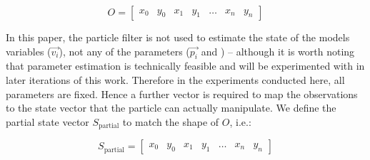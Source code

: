\begin{equation}
  O  = \left[ \begin{array}{ccccccc}
x_0 & y_0 & x_1 & y_1 & \dots & x_n & y_n 
\end{array} \right]
\end{equation} 

In this paper, the particle filter is not used to estimate the state of the models variables ($\overrightarrow{v_i}$), not any of the parameters ($\overrightarrow{p_i}$ and ) -- although it is worth noting that parameter estimation is technically feasible and will be experimented with in later iterations of this work. Therefore in the experiments conducted here, all parameters are fixed. Hence a further vector is required to map the observations to the state vector that the particle can actually manipulate. We define the partial state vector $S_\textrm{partial}$ to match the shape of $O$, i.e.:

\begin{equation}
  S_\textrm{partial}  = \left[ \begin{array}{ccccccc}
x_0 & y_0 & x_1 & y_1 & \dots & x_n & y_n 
\end{array} \right]
\end{equation} 



